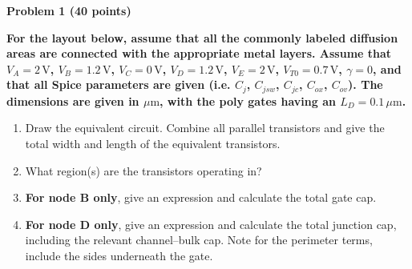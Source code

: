 \begingroup
\fontsize{10.95}{12.5}\selectfont
\setlength{\parskip}{4pt}
\textbf{Problem 1 (40 points)}\par
\textbf{For the layout below, assume that all the commonly labeled diffusion areas are connected with the appropriate metal layers. Assume that
$V_A=2\,\mathrm V$, $V_B=1.2\,\mathrm V$, $V_C=0\,\mathrm V$,
$V_D=1.2\,\mathrm V$, $V_E=2\,\mathrm V$, $V_{T0}=0.7\,\mathrm V$,
$\gamma=0$, and that all Spice parameters are given (i.e. $C_j$, $C_{jsw}$,
$C_{jc}$, $C_{ox}$, $C_{ov}$). The dimensions are given in $\mu\mathrm m$,
with the poly gates having an $L_D=0.1\,\mu\mathrm m$.}
\begin{enumerate}[label=\alph*),leftmargin=.24in,itemsep=0pt,topsep=1pt]
\item Draw the equivalent circuit. Combine all parallel transistors and give the total width and length of the equivalent transistors.
\item What region(s) are the transistors operating in?
\item \textbf{For node B only}, give an expression and calculate the total gate cap.
\item \textbf{For node D only}, give an expression and calculate the total junction cap, including the relevant channel--bulk cap. Note for the perimeter terms, include the sides underneath the gate.
\end{enumerate}
\vspace{2pt}
